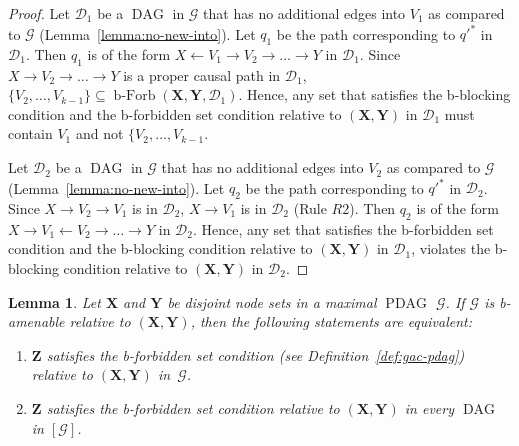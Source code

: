 \documentclass[letterpaper]{article}
\newtheorem{lemma}[theorem]{Lemma}
\theoremstyle{definition}
\theoremstyle{remark}
\DeclareMathOperator{\PDAG}{PDAG}
\DeclareMathOperator{\DAG}{DAG}
\DeclareMathOperator{\bForbb}{b-Forb}
\newcommand{\bforb}{the b-forbidden set condition}
\newcommand{\bblck}{the b-blocking condition}
\newcommand{\mpdag}{maximal $\PDAG$}
\newcommand{\g}[1][G]{\mathcal{#1}}
\newcommand{\bfb}[2][X,Y]{\bForbb(\mathbf{#1},#2)}
\newcommand{\pstar}[1][p]{{#1}^{*}}
\begin{document}
\begin{proof}
Let $\g[D]_1$ be a $\DAG$ in $\g$ that has no additional edges into $V_1$ as compared to $\g$ (Lemma~\ref{lemma:no-new-into}). Let $q_1$ be the path corresponding to $\pstar[q']$ in $\g[D]_1$. Then $q_1$ is of the form $X \leftarrow V_1 \rightarrow V_2 \rightarrow \dots \rightarrow Y$ in $\g[D]_1$. Since $X \rightarrow V_2 \rightarrow \dots \rightarrow Y$ is a proper causal path in $\g[D]_1$, $\{V_2, \dots, V_{k-1}\} \subseteq \bfb{\g[D]_{1}}$. Hence, any set that satisfies \bblck{} and \bforb{} relative to $(\mathbf{X,Y})$ in $\g[D]_{1}$ must contain $V_1$ and not $\{V_2,\dots,V_{k-1}$. 

Let $\g[D]_2$ be a $\DAG$ in $\g$ that has no additional edges into $V_2$ as compared to $\g$ (Lemma~\ref{lemma:no-new-into}). Let $q_2$ be the path corresponding to $\pstar[q']$ in $\g[D]_2$. Since $X \rightarrow V_2 \rightarrow V_1$ is in $\g[D]_2$, $X \rightarrow V_1$ is in $\g[D]_2$ (Rule $R2$). Then $q_2$ is of the form $ X \rightarrow V_1 \leftarrow V_2 \rightarrow \dots \rightarrow Y$ in $\g[D]_2$. Hence, any set that satisfies \bforb{} and \bblck{} {} relative to $(\mathbf{X,Y})$ in $\g[D]_{1}$, violates \bblck{} {} relative to $(\mathbf{X,Y})$ in $\g[D]_{2}$.
\end{proof}

\begin{lemma}
  Let $\mathbf{X}$ and $\mathbf{Y}$ be disjoint node sets in a \mpdag{} $\g$. If $\g$ is b-amenable relative to $(\mathbf{X},\mathbf{Y})$, then the following statements are equivalent:
\begin{enumerate}[label = (\roman*)]
\item\label{l:eqa1-pdag} $\mathbf{Z}$ satisfies \bforb{} (see Definition~\ref{def:gac-pdag}) relative to $(\mathbf{X},\mathbf{Y})$ in~$\g$.
\item\label{l:eqa2-pdag}  $\mathbf{Z}$ satisfies \bforb{} relative to $(\mathbf{X},\mathbf{Y})$ in every $\DAG$ in $[\g]$.
\end{enumerate}
   \label{lemma:eqpdag}
\end{lemma}
\end{document}
